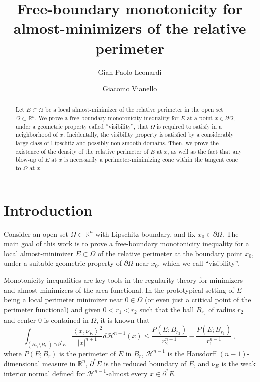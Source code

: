 \documentclass[a4paper,reqno,11pt]{amsart}
\author{Gian Paolo Leonardi}
\author{Giacomo Vianello}
\title[Free-boundary monotonicity for almost-minimizers]{Free-boundary monotonicity for almost-minimizers of the relative perimeter}
\newcommand{\R}{\mathbb{R}}
\newcommand{\Hau}{{\mathcal H}} %
\newcommand{\de}{\partial}
\newcommand{\p}{P}
\newcommand{\footred}[1]{%
	\renewcommand\thefootnote{\textcolor{red}{\arabic{footnote}}}%
	\footnote{\color{red} #1}%
	\renewcommand\thefootnote{\textcolor{black}{\arabic{footnote}}}%
}
\newcommand{\footredGP}[1]{\footred{GP: #1}}
\begin{document}
\begin{abstract}
Let $E \subset \Omega$ be a local almost-minimizer of the relative perimeter in the open set $\Omega\subset \R^{n}$. We prove a free-boundary monotonicity inequality for $E$ at a point $x\in \de\Omega$, under a geometric property called ``visibility'', that $\Omega$ is required to satisfy in a neighborhood of $x$. Incidentally, the visibility property is satisfied by a considerably large class of Lipschitz and possibly non-smooth domains. Then, we prove the existence of the density of the relative perimeter of $E$ at $x$, as well as the fact that any blow-up of $E$ at $x$ is necessarily a perimeter-minimizing cone within the tangent cone to $\Omega$ at $x$.
\end{abstract}

\maketitle
\tableofcontents

\section{Introduction}

Consider an open set $\Omega\subset \R^{n}$ with Lipschitz boundary, and fix $x_{0}\in \de \Omega$. The main goal of this work is to prove a free-boundary monotonicity inequality for a local almost-minimizer $E\subset \Omega$ of the relative perimeter at the boundary point $x_{0}$, under a suitable geometric property of  $\de\Omega$ near $x_{0}$, which we call ``visibility''.

Monotonicity inequalities are key tools in the regularity theory for minimizers and almost-minimizers of the area functional. In the prototypical setting of $E$ being a local perimeter minimizer near $0\in \Omega$ (or even just a critical point of the perimeter functional) and given $0<r_{1}<r_{2}$ such that the ball $B_{r_{2}}$ of radius $r_{2}$ and center $0$ is contained in $\Omega$, it is known that 
\begin{equation} \label{eq:M}
\int_{(B_{r_{2}} \setminus B_{r_{1}})\cap \de^{*}E} \frac{\left\langle x, \nu_{E} \right\rangle^{2}}{|x|^{n+1}} d \Hau^{n-1}(x) \leq \frac{\p(E;B_{r_{2}})}{r_{2}^{n-1}} - \frac{\p(E;B_{r_{1}})}{r_{1}^{n-1}}\, ,
\end{equation}
where $\p(E;B_{r})$ is the perimeter of $E$ in $B_{r}$, $\Hau^{n-1}$ is the Hausdorff $(n-1)$-dimensional measure in $\R^{n}$, $\de^{*}E$ is the reduced boundary of $E$, and $\nu_{E}$ is the weak interior normal defined for $\Hau^{n-1}$-almost every $x\in \de^{*}E$. 
\end{document}
